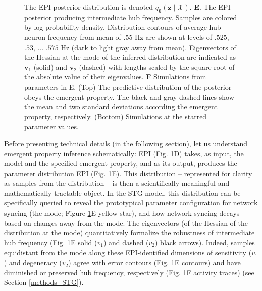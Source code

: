 \documentclass[11pt]{article}
\begin{document}
\begin{figure}
{The EPI posterior distribution is denoted $q_{\bm{\theta}}(\mathbf{z} \mid \mathcal{X})$. 
\textbf{E}. The EPI posterior producing intermediate hub frequency.
Samples are colored by log probability density.  
Distribution contours of average hub neuron frequency from mean of .55 Hz are shown at levels of $.525$, $.53$, ... $.575$ Hz (dark to light gray away from mean).
Eigenvectors of the Hessian at the mode of the inferred distribution are indicated as $\mathbf{v}_1$ (solid) and $\mathbf{v}_2$ (dashed) with lengths scaled by the square root of the absolute value of their eigenvalues.  
\textbf{F} Simulations from parameters in E.  
(Top) The predictive distribution of the posterior obeys the emergent property.
The black and gray dashed lines show the mean and two standard deviations according the emergent property, respectively.
(Bottom) Simulations at the starred parameter values.
 }
 \label{fig:STG}
\end{figure}


Before presenting technical details (in the following section), let us understand emergent property inference schematically:  EPI (Fig. \ref{fig:STG}D) takes, as input, the model and the specified emergent property, and as its output, produces the parameter distribution  EPI (Fig. \ref{fig:STG}E).  
This distribution -- represented for clarity as samples from the distribution -- is then a scientifically meaningful and mathematically tractable object.  
In the STG model, this distribution can be specifically queried to reveal the prototypical parameter configuration for network syncing (the mode; Figure \ref{fig:STG}E yellow star), and how network syncing decays based on changes away from the mode.
The eigenvectors (of the Hessian of the distribution at the mode) quantitatively formalize the robustness of intermediate hub frequency (Fig. \ref{fig:STG}E solid ($v_1$) and dashed  ($v_2$) black arrows).
Indeed, samples equidistant from the mode along these EPI-identified dimensions of sensitivity ($v_1$) and degeneracy ($v_2$) agree with error contours (Fig. \ref{fig:STG}E contours) and have diminished or preserved hub frequency, respectively (Fig. \ref{fig:STG}F activity traces) (see Section \ref{methods_STG}).
\end{document}
